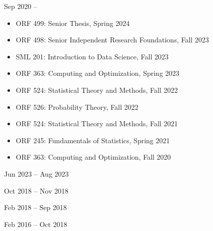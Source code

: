 \documentclass[
  date,
  number,
]{wgu-cv}
\begin{document}
\vspace*{-4mm}


{}
{Sep 2020 --}

\begin{itemize}

  \item
    ORF 499:
    Senior Thesis,
    Spring 2024

  \item
    ORF 498:
    Senior Independent Research Foundations,
    Fall 2023

  \item
    SML 201:
    Introduction to Data Science,
    Fall 2023

  \item
    ORF 363:
    Computing and Optimization,
    Spring 2023

  \item
    ORF 524:
    Statistical Theory and Methods,
    Fall 2022

  \item
    ORF 526:
    Probability Theory,
    Fall 2022

  \item
    ORF 524:
    Statistical Theory and Methods,
    Fall 2021

  \item
    ORF 245:
    Fundamentals of Statistics,
    Spring 2021

  \item
    ORF 363:
    Computing and Optimization,
    Fall 2020

\end{itemize}

{}
{Jun 2023 -- Aug 2023}
\vspace*{2mm}

{}
{Oct 2018 -- Nov 2018}
\vspace*{2mm}

{}
{Feb 2018 -- Sep 2018}
\vspace*{2mm}

{}
{Feb 2016 -- Oct 2018}
\vspace*{2mm}
\end{document}

